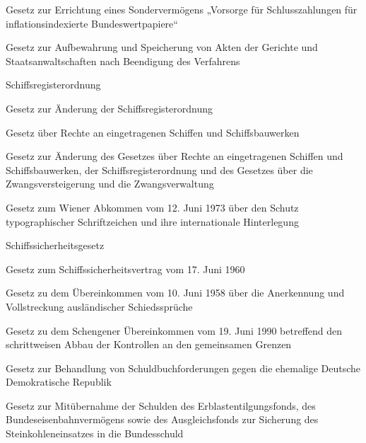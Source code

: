 \item[{SchlussFinG}] Gesetz zur Errichtung eines Sondervermögens „Vorsorge für Schlusszahlungen für inflationsindexierte Bundeswertpapiere“

\item[{SchrAG}] Gesetz zur Aufbewahrung und Speicherung von Akten der Gerichte und Staatsanwaltschaften nach Beendigung des Verfahrens

\item[{SchRegO}] Schiffsregisterordnung

\item[{SchRegOÄndG}] Gesetz zur Änderung der Schiffsregisterordnung

\item[{SchRG}] Gesetz über Rechte an eingetragenen Schiffen und Schiffsbauwerken

\item[{SchRGÄndG}] Gesetz zur Änderung des Gesetzes über Rechte an eingetragenen Schiffen und Schiffsbauwerken, der Schiffsregisterordnung und des Gesetzes über die Zwangsversteigerung und die Zwangsverwaltung

\item[{SchrZAbkG}] Gesetz zum Wiener Abkommen vom 12. Juni 1973 über den Schutz typographischer Schriftzeichen und ihre internationale Hinterlegung

\item[{SchSG}] Schiffssicherheitsgesetz

\item[{SchSichVtr1960G}] Gesetz zum Schiffssicherheitsvertrag vom 17. Juni 1960

\item[{SchSprAnerkÜbkG}] Gesetz zu dem Übereinkommen vom 10. Juni 1958 über die Anerkennung und Vollstreckung ausländischer Schiedssprüche

\item[{SchÜbkDÜbkG}] Gesetz zu dem Schengener Übereinkommen vom 19. Juni 1990 betreffend den schrittweisen Abbau der Kontrollen an den gemeinsamen Grenzen

\item[{SchuldBBerG}] Gesetz zur Behandlung von Schuldbuchforderungen gegen die ehemalige Deutsche Demokratische Republik

\item[{SchuldMitüG}] Gesetz zur Mitübernahme der Schulden des Erblastentilgungsfonds, des Bundeseisenbahnvermögens sowie des Ausgleichsfonds zur Sicherung des Steinkohleneinsatzes in die Bundesschuld


